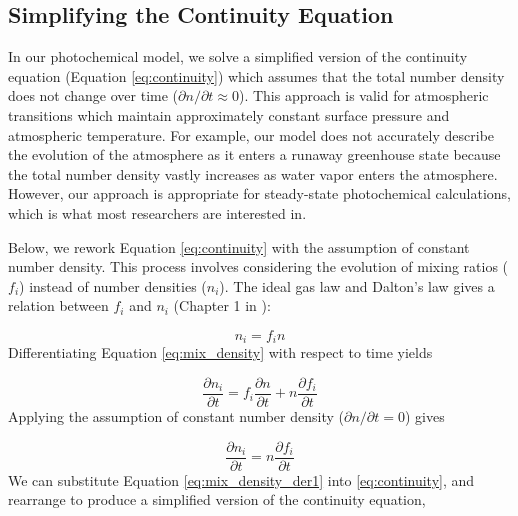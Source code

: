 \documentclass{article}
\begin{document}
\subsection{Simplifying the Continuity Equation}

In our photochemical model, we solve a simplified version of the continuity equation (Equation \eqref{eq:continuity}) which assumes that the total number density does not change over time ($\partial n / \partial t \approx 0$). This approach is valid for atmospheric transitions which maintain approximately constant surface pressure and atmospheric temperature. For example, our model does not accurately describe the evolution of the atmosphere as it enters a runaway greenhouse state because the total number density vastly increases as water vapor enters the atmosphere. However, our approach is appropriate for steady-state photochemical calculations, which is what most researchers are interested in.


Below, we rework Equation \eqref{eq:continuity} with the assumption of constant number density. This process involves considering the evolution of mixing ratios ($f_i$) instead of number densities ($n_i$). The ideal gas law and Dalton's law gives a relation between $f_i$ and $n_i$ (Chapter 1 in \cite{Catling_2017}):

\begin{equation} \label{eq:mix_density}
  n_i = f_i n
\end{equation}
Differentiating Equation \eqref{eq:mix_density} with respect to time yields

\begin{equation} \label{eq:mix_density_der}
  \frac{\partial n_i}{\partial t} = f_i \frac{\partial n}{\partial t} + n \frac{\partial f_i}{\partial t}
\end{equation}
Applying the assumption of constant number density ($\partial n / \partial t = 0$) gives

\begin{equation} \label{eq:mix_density_der1}
  \frac{\partial n_i}{\partial t} = n \frac{\partial f_i}{\partial t}
\end{equation}
We can substitute Equation \eqref{eq:mix_density_der1} into \eqref{eq:continuity}, and rearrange to produce a simplified version of the continuity equation,
\end{document}
